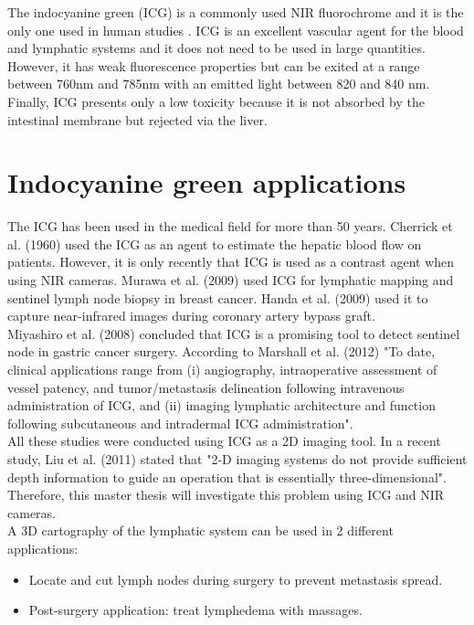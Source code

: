 The indocyanine green (ICG) is a commonly used NIR fluorochrome and it is the only one used in human studies \cite{marshall_near-infrared_2010}. ICG is an excellent vascular agent for the blood and lymphatic systems and it does not need to be used in large quantities. However, it has weak fluorescence properties but can be exited at a range between 760nm and 785nm with an emitted light between 820 and 840 nm. \\

Finally, ICG presents only a low toxicity \cite{m_adverse_1994} because it is not absorbed by the intestinal membrane but rejected via the liver.

\section{Indocyanine green applications}
\label{sec: ICG Applications}
The ICG has been used in the medical field for more than 50 years. Cherrick et al. (1960) \cite{cherrick_indocyanine_1960} used the ICG as an agent to estimate the hepatic blood flow on patients.  However, it is only recently that ICG is used as a contrast agent when using NIR cameras. Murawa et al. (2009) \cite{murawa_sentinel_2009} used ICG for lymphatic mapping and sentinel lymph node biopsy in breast cancer. Handa et al. (2009) \cite{handa_preliminary_2009} used it to capture near-infrared images during coronary artery bypass graft. \\

Miyashiro et al. (2008) \cite{miyashiro_detection_2008} concluded that ICG is a promising tool to detect sentinel node in gastric cancer surgery. According to Marshall et al. (2012) \cite{marshall_near-infrared_2010} "To date, clinical applications range from (i) angiography, intraoperative assessment of vessel patency, and tumor/metastasis delineation following intravenous administration of ICG, and (ii) imaging lymphatic architecture and function following subcutaneous and intradermal ICG administration".\\

All these studies were conducted using ICG as a 2D imaging tool. In a recent study, Liu et al. (2011) \cite{liu_hands-free_2011} stated that "2-D imaging systems do not provide sufficient depth information to guide an operation that is essentially three-dimensional". Therefore, this master thesis will investigate this problem using ICG and NIR cameras. \\

A 3D cartography of the lymphatic system can be used in 2 different applications:
\begin{itemize}
  \item Locate and cut lymph nodes during surgery to prevent metastasis spread.
  \item Post-surgery application: treat lymphedema with massages. 
\end{itemize}

